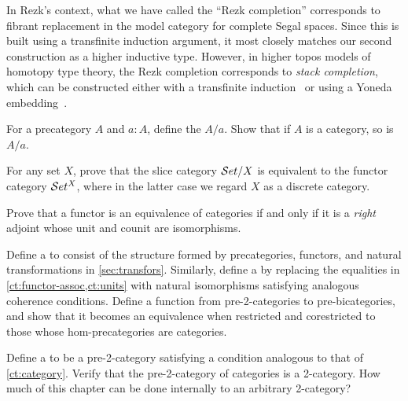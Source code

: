 In Rezk's context, what we have called the ``Rezk completion'' corresponds to fibrant replacement in the model category for complete Segal spaces.
Since this is built using a transfinite induction argument, it most closely matches our second construction as a higher inductive type.
However, in higher topos models of homotopy type theory, the Rezk completion corresponds to \emph{stack completion}, which can be constructed either with a transfinite induction~\cite{jt:strong-stacks} or using a Yoneda embedding~\cite{bunge:stacks-morita-internal}.

\sectionExercises

\begin{ex}
  For a precategory $A$ and $a:A$, define the  $A/a$.
  Show that if $A$ is a category, so is $A/a$.
\end{ex}

\begin{ex}
  For any set $X$, prove that the slice category $\mathcal{S}et/X$ is equivalent to the functor category $\mathcal{S}et^X$, where in the latter case we regard $X$ as a discrete category.
\end{ex}

\begin{ex}
  Prove that a functor is an equivalence of categories if and only if it is a \emph{right} adjoint whose unit and counit are isomorphisms.
\end{ex}

\begin{ex}\label{ct:pre2cat}
  Define a  to consist of the structure formed by precategories, functors, and natural transformations in \autoref{sec:transfors}.
  Similarly, define a  by replacing the equalities in \autoref{ct:functor-assoc,ct:units} with natural isomorphisms satisfying analogous coherence conditions.
  Define a function from pre-2-categories to pre-bicategories, and show that it becomes an equivalence when restricted and corestricted to those whose hom-precategories are categories.
\end{ex}

\begin{ex}\label{ct:2cat}
  Define a  to be a pre-2-category satisfying a condition analogous to that of \autoref{ct:category}.
  Verify that the pre-2-category of categories \ucat is a 2-category.
  How much of this chapter can be done internally to an arbitrary 2-category?
\end{ex}

